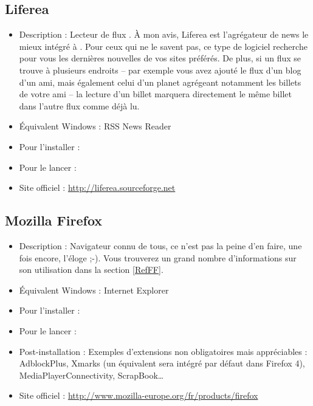 \subsection{Liferea}
\label{RefInstallLiferea}
\begin{itemize}
\begingroup
{}
\item Description : Lecteur de flux . À mon avis, Liferea est l'agrégateur de news le mieux intégré à . Pour ceux qui ne le savent pas, ce type de logiciel recherche pour vous les dernières nouvelles de vos sites préférés. De plus, si un flux se trouve à plusieurs endroits -- par exemple vous avez ajouté le flux d'un blog d'un ami, mais également celui d'un planet agrégeant notamment les billets de votre ami -- la lecture d'un billet marquera directement le même billet dans l'autre flux comme déjà lu.{\par}
\item Équivalent Windows : RSS News Reader{\par}
\item Pour l'installer : 
\item Pour le lancer : 
\item Site officiel : \url{http://liferea.sourceforge.net}{\par}
\endgroup
\end{itemize}

\subsection{Mozilla Firefox}
\begin{itemize}
\begingroup
{}
\item Description : Navigateur connu de tous, ce n'est pas la peine d'en faire, une fois encore, l'éloge ;-). Vous trouverez un grand nombre d'informations sur son utilisation dans la section \ref{RefFF}.{\par}
\endgroup
\item Équivalent Windows : Internet Explorer{\par}
\item Pour l'installer : 
\item Pour le lancer : 
\item Post-installation : Exemples d'extensions non obligatoires mais appréciables : AdblockPlus, Xmarks (un équivalent sera intégré par défaut dans Firefox 4), MediaPlayerConnectivity, ScrapBook\ldots{}{\par}
\item Site officiel : \url{http://www.mozilla-europe.org/fr/products/firefox}{\par}
\end{itemize}
